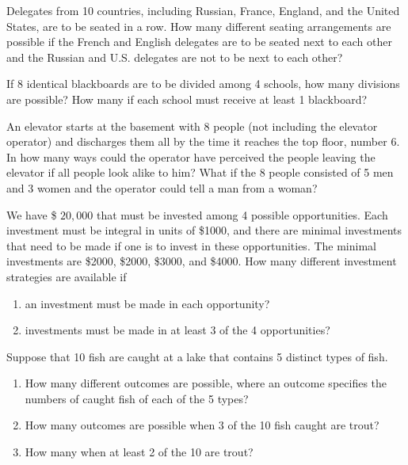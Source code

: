 \documentclass[12pt]{article}
\newenvironment{problem}[2][Problem]{\begin{trivlist}
\item[\hskip \labelsep {\bfseries #1}\hskip \labelsep {\bfseries #2.}]}{\end{trivlist}}
\begin{document}
\begin{problem}{  1.30 }
Delegates from 10 countries, including Russian, France, England, and the United States, are to be seated in a row. How many different seating arrangements are possible if the French and English delegates are to be seated next to each other and the Russian and U.S. delegates are not to be next to each other?
\end{problem}



\begin{problem}{ *1.31  }
If 8 identical blackboards are to be divided among 4 schools, how many divisions are possible? How many if each school must receive at least 1 blackboard?
\end{problem}


\begin{problem}{ *1.32  }
An elevator starts at the basement with 8 people (not including the elevator operator) and discharges them all by the time it reaches the top floor, number 6. In how many ways could the operator have perceived the people leaving the elevator if all people look alike to him? What if the 8 people consisted of 5 men and 3 women and the operator could tell a man from a woman?
\end{problem}


\begin{problem}{ *1.33}
We have \$ $20,000$ that must be invested among 4 possible opportunities. Each investment must be integral in units of \$1000, and there are minimal investments that need to be made if one is to invest in these opportunities. The minimal investments are \$2000, \$2000, \$3000, and \$4000. How many different investment strategies are available if
\begin{enumerate}[label=(\alph*)]
	\item an investment must be made in each opportunity?
	\item investments must be made in at least 3 of the 4 opportunities?
\end{enumerate}
\end{problem}



\begin{problem}{ *1.34 }
Suppose that 10 fish are caught at a lake that contains 5 distinct types of fish.
\begin{enumerate}[label=(\alph*)]
	\item How many different outcomes are possible, where an outcome specifies the numbers of caught fish of each of the 5 types?
	\item How many outcomes are possible when 3 of the 10 fish caught are trout?
	\item How many when at least 2 of the 10 are trout?
\end{enumerate}
\end{problem}
\end{document}
